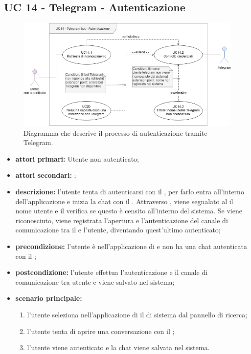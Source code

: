 \subsection{UC 14 - Telegram - Autenticazione}
		
	\begin{figure}[H]
		\centering
		\includegraphics[scale=0.60]{res/images/uc14}
		\caption{Diagramma che descrive il processo di autenticazione tramite Telegram.}
	\end{figure}
		
	\begin{itemize}
		\item \textbf{attori primari:} Utente non autenticato;
		\item \textbf{attori secondari:} ;
		\item \textbf{descrizione:} l'utente tenta di autenticarsi con il  , per farlo entra all'interno dell'applicazione e inizia la chat con il . Attraverso , viene segnalato al  il nome utente e il  verifica se questo è censito all'interno del sistema. Se viene riconosciuto, viene registrata l'apertura e l'autenticazione del canale di comunicazione tra il  e l'utente, diventando quest'ultimo autenticato; 
		\item \textbf{precondizione:} l'utente è nell'applicazione di  e non ha una chat autenticata con il ;
		\item \textbf{postcondizione:} l'utente effettua l'autenticazione e il canale di comunicazione tra utente e  viene salvato nel sistema;
		\item \textbf{scenario principale:}
		\begin{enumerate}
			\item l'utente seleziona nell'applicazione di  il  di sistema dal pannello di ricerca;
			\item l'utente tenta di aprire una conversazione con il ;
			\item l'utente viene autenticato e la chat viene salvata nel sistema.
		\end{enumerate}
	\end{itemize}
	
